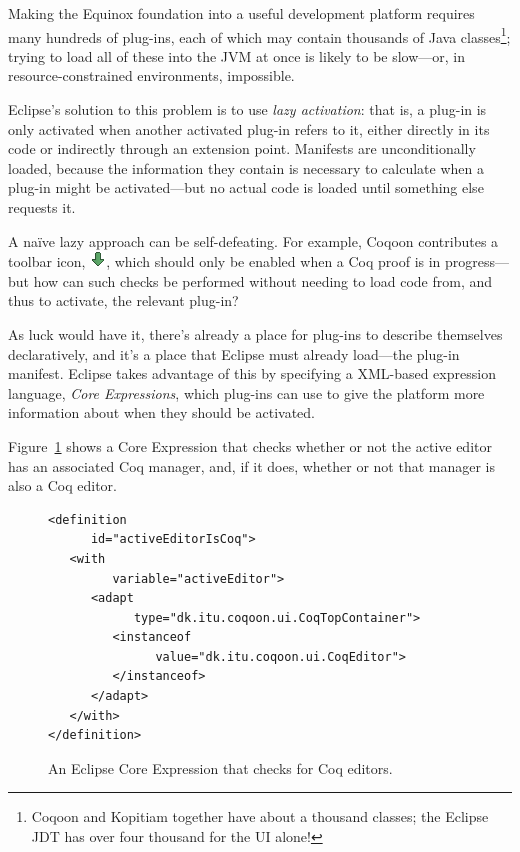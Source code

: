 \documentclass{article}
\newcommand{\fdef}[1]{\textit{#1}}
\begin{document}
Making the Equinox foundation into a useful development platform requires many
hundreds of plug-ins, each of which may contain thousands of Java
classes\footnote{Coqoon and Kopitiam together have about a thousand classes;
the Eclipse JDT has over four thousand for the UI alone!}; trying to load all
of these into the JVM at once is likely to be slow---or, in
resource-constrained environments, impossible.

Eclipse's solution to this problem is to use \fdef{lazy activation}: that is,
a plug-in is only activated when another activated plug-in refers to it, either
directly in its code or indirectly through an extension point. Manifests are
unconditionally loaded, because the information they contain is necessary to
calculate when a plug-in might be activated---but no actual code is loaded
until something else requests it.

A naïve lazy approach can be self-defeating. For example, Coqoon contributes a
toolbar icon, \includegraphics[scale=0.5]{down.png}, which should only be
enabled when a Coq proof is in progress---but how can such checks be performed
without needing to load code from, and thus to activate, the relevant plug-in?

As luck would have it, there's already a place for plug-ins to describe
themselves declaratively, and it's a place that Eclipse must already load---the
plug-in manifest. Eclipse takes advantage of this by specifying a XML-based
expression language, \fdef{Core Expressions}, which plug-ins can use to give
the platform more information about when they should be activated.

Figure~\ref{fig:edexpr} shows a Core Expression that checks whether or not the
active editor has an associated Coq manager, and, if it does, whether or not
that manager is also a Coq editor.

\begin{figure}[h]
\begin{lstlisting}[basicstyle=\footnotesize\ttfamily]
<definition
      id="activeEditorIsCoq">
   <with
         variable="activeEditor">
      <adapt
            type="dk.itu.coqoon.ui.CoqTopContainer">
         <instanceof
               value="dk.itu.coqoon.ui.CoqEditor">
         </instanceof>
      </adapt>
   </with>
</definition>
\end{lstlisting}
\caption{An Eclipse Core Expression that checks for Coq editors.}
\label{fig:edexpr}
\end{figure}
\end{document}
